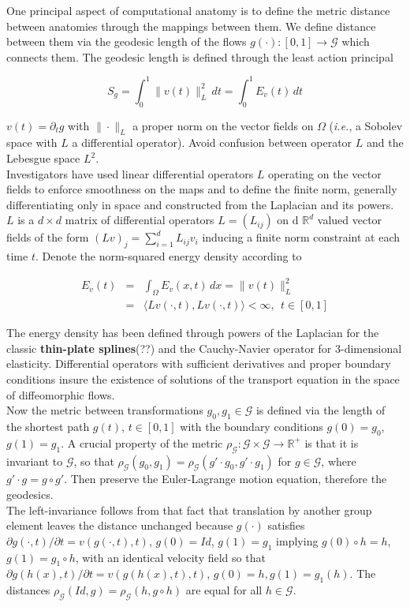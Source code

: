\documentclass[final, paper=letter,5p,times,twocolumn]{elsarticle}
\newcommand{\CA}{computational anatomy}
\theoremstyle{definition}
\begin{document}
{One principal aspect of \CA{} is to define the metric distance between anatomies through the mappings between them. We define distance between them via the geodesic length of the flows $g(\cdot): [0, 1] \rightarrow \mathcal{G}$ which connects them. The geodesic length is defined through the least action principal 

$$
S_{g} = \int_{0}^{1} \|v(t)\|_{L}^{2} \,dt = \int_{0}^{1} E_{v}(t) \,dt
$$ 

$v(t) = \partial_{t} g$ with $\| \cdot \|_{L}$ a proper norm on the vector fields on $\Omega$ ({\it i.e.}, a Sobolev space with $L$ a differential operator). Avoid confusion between operator $L$ and the Lebesgue space $L^{2}$.\\

Investigators have used linear differential operators $L$ operating on the vector fields to enforce smoothness on the maps and to define the finite norm, generally differentiating only in space and constructed from the Laplacian and its powers. $L$ is a $d \times d$ matrix of differential operators $L = (L_{ij})$ on d $\mathbb{R}^{d}$ valued vector fields of the form $(Lv)_{j} = \sum_{i = 1}^{d} L_{ij}v_{i}$ inducing a finite norm constraint at each time $t$. Denote the norm-squared energy density according to 

\begin{eqnarray*}
  E_{v}(t) & = & \int_{\Omega}E_{v}(x,t) \, dx = \| v(t)\|_{L}^{2} \\
  & = & \langle Lv(\cdot, t), Lv(\cdot, t) \rangle < \infty, ~~t \in [0,1]
\label{EnergyDensity}
\end{eqnarray*}

The energy density has been defined through powers of the Laplacian for the classic {\bf thin-plate splines}(??) and the Cauchy-Navier operator for 3-dimensional elasticity. Differential operators with sufficient derivatives and proper boundary conditions insure the existence of solutions of the transport equation in the space of diffeomorphic flows.\\

Now the metric between transformations $g_{0}, g_{1} \in \mathcal{G}$ is defined via the length of the shortest path $g(t)$, $t \in [0, 1]$ with the boundary conditions $g(0) = g_{0}$, $g(1) = g_{1}$. A crucial property of the metric $\rho_{\mathcal{G}}: \mathcal{G} \times \mathcal{G} \rightarrow \mathbb{R}^{+}$ is that it is invariant to $\mathcal{G}$, so that $\rho_{\mathcal{G}}(g_{0}, g_{1}) = \rho_{\mathcal{G}}(g' \cdot g_{0}, g' \cdot g_{1})$ for $g \in \mathcal{G}$, where $g' \cdot g = g \circ g'$. Then preserve the Euler-Lagrange motion equation, therefore the geodesics.\\
The left-invariance follows from that fact that translation by another group element leaves the distance unchanged because $g(\cdot)$ satisfies $\partial g(\cdot, t) / \partial t = v(g(\cdot, t), t)$, $g(0) = Id$, $g(1) = g_{1}$ implying $g(0) \circ h = h$, $g(1) = g_{1} \circ h$, with an identical velocity field so that $\partial g(h(x),t)/\partial t = v(g(h(x),t),t)$, $g(0) = h, g(1) = g_{1}(h)$. The distances $\rho_{\mathcal{G}}(Id, g) = \rho_{\mathcal{G}}(h, g \circ h)$ are equal for all $h \in \mathcal{G}$.

}
\end{document}
